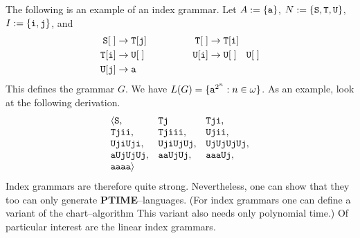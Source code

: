 The following is an example of an index grammar.
Let $A := \{ \mbox{\tt a}\}$, $N := \{\mbox{\tt S}, \mbox{\tt T},
\mbox{\tt U}\}$, $I := \{\mbox{\tt i}, \mbox{\tt j}\}$, and
\begin{equation}
\begin{split}
\mbox{\tt S}[\;] & \rightarrow \mbox{\tt T}[\mbox{\tt j}] & 
\qquad\qquad \mbox{\tt T}[\;] & \rightarrow \mbox{\tt T}[\mbox{\tt i}] \\
\mbox{\tt T}[\mbox{\tt i}] & \rightarrow \mbox{\tt U}[\;] &
\mbox{\tt U}[\mbox{\tt i}] & \rightarrow \mbox{\tt U}[\; ] \quad
    \mbox{\tt U}[\;] \\
\mbox{\tt U}[\mbox{\tt j}] & \rightarrow \mbox{\tt a}
\end{split}
\end{equation}
This defines the grammar $G$. We have $L(G) = \{\mbox{\tt a}^{2^n}
: n \in \omega\}$. As an example, look at the following derivation.
\begin{equation}
\begin{array}{l@{\quad}l@{\quad}l}
\auf \mbox{\tt S}, & \mbox{\tt Tj}     & \mbox{\tt Tji}, \\
\mbox{\tt Tjii},   & \mbox{\tt Tjiii}, & \mbox{\tt Ujii}, \\
\mbox{\tt UjiUji}, & \mbox{\tt UjiUjUj}, & \mbox{\tt UjUjUjUj}, \\
\mbox{\tt aUjUjUj},& \mbox{\tt aaUjUj}, & \mbox{\tt aaaUj}, \\
\mbox{\tt aaaa}\zu
\end{array}
\end{equation}
Index grammars are therefore quite strong. Nevertheless, one can
show that they too can only generate \textbf{PTIME}--languages.
(For index grammars one can define a variant of the chart--algorithm
This variant also needs only polynomial time.)
Of particular interest are the linear index grammars.

